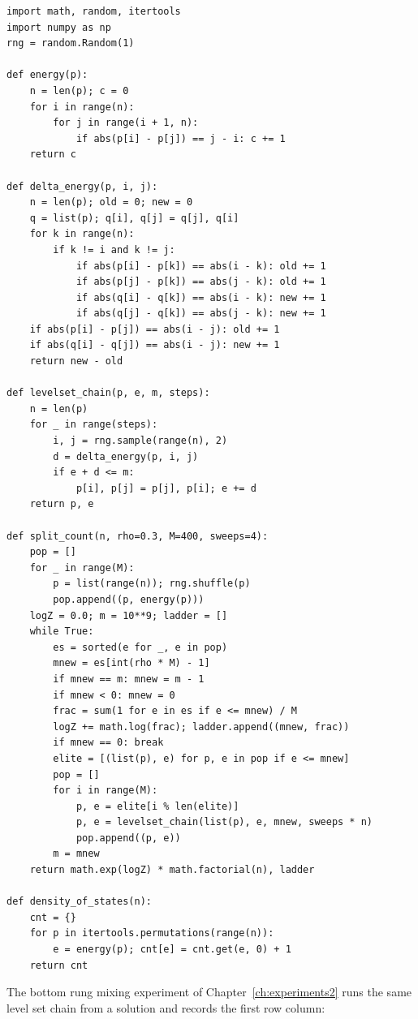 \begin{footnotesize}
\begin{verbatim}
import math, random, itertools
import numpy as np
rng = random.Random(1)

def energy(p):
    n = len(p); c = 0
    for i in range(n):
        for j in range(i + 1, n):
            if abs(p[i] - p[j]) == j - i: c += 1
    return c

def delta_energy(p, i, j):
    n = len(p); old = 0; new = 0
    q = list(p); q[i], q[j] = q[j], q[i]
    for k in range(n):
        if k != i and k != j:
            if abs(p[i] - p[k]) == abs(i - k): old += 1
            if abs(p[j] - p[k]) == abs(j - k): old += 1
            if abs(q[i] - q[k]) == abs(i - k): new += 1
            if abs(q[j] - q[k]) == abs(j - k): new += 1
    if abs(p[i] - p[j]) == abs(i - j): old += 1
    if abs(q[i] - q[j]) == abs(i - j): new += 1
    return new - old

def levelset_chain(p, e, m, steps):
    n = len(p)
    for _ in range(steps):
        i, j = rng.sample(range(n), 2)
        d = delta_energy(p, i, j)
        if e + d <= m:
            p[i], p[j] = p[j], p[i]; e += d
    return p, e

def split_count(n, rho=0.3, M=400, sweeps=4):
    pop = []
    for _ in range(M):
        p = list(range(n)); rng.shuffle(p)
        pop.append((p, energy(p)))
    logZ = 0.0; m = 10**9; ladder = []
    while True:
        es = sorted(e for _, e in pop)
        mnew = es[int(rho * M) - 1]
        if mnew == m: mnew = m - 1
        if mnew < 0: mnew = 0
        frac = sum(1 for e in es if e <= mnew) / M
        logZ += math.log(frac); ladder.append((mnew, frac))
        if mnew == 0: break
        elite = [(list(p), e) for p, e in pop if e <= mnew]
        pop = []
        for i in range(M):
            p, e = elite[i % len(elite)]
            p, e = levelset_chain(list(p), e, mnew, sweeps * n)
            pop.append((p, e))
        m = mnew
    return math.exp(logZ) * math.factorial(n), ladder

def density_of_states(n):
    cnt = {}
    for p in itertools.permutations(range(n)):
        e = energy(p); cnt[e] = cnt.get(e, 0) + 1
    return cnt
\end{verbatim}
\end{footnotesize}

The bottom rung mixing experiment of Chapter~\ref{ch:experiments2} runs the same level set chain from a solution and records the first row column:

